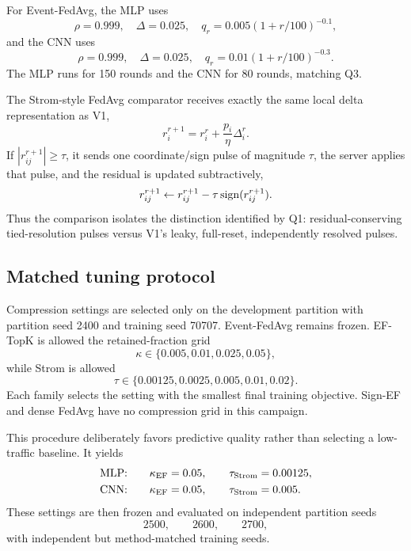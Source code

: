 For Event-FedAvg, the MLP uses
\begin{equation}
    \rho=0.999,\quad \Delta=0.025,\quad
    q_r=0.005(1+r/100)^{-0.1},
\end{equation}
and the CNN uses
\begin{equation}
    \rho=0.999,\quad \Delta=0.025,\quad
    q_r=0.01(1+r/100)^{-0.3}.
\end{equation}
The MLP runs for 150 rounds and the CNN for 80 rounds, matching Q3.

The Strom-style FedAvg comparator receives exactly the same local delta representation as V1,
\begin{equation}
    r_i^{r+1}=r_i^r+\frac{p_i}{\eta}\Delta_i^r.
\end{equation}
If $|r_{ij}^{r+1}|\geq\tau$, it sends one coordinate/sign pulse of magnitude $\tau$, the server applies that pulse, and the residual is updated subtractively,
\begin{equation}
    r_{ij}^{r+1}\leftarrow
    r_{ij}^{r+1}-\tau\operatorname{sign}(r_{ij}^{r+1}).
\end{equation}
Thus the comparison isolates the distinction identified by Q1: residual-conserving tied-resolution pulses versus V1's leaky, full-reset, independently resolved pulses.

\subsection{Matched tuning protocol}

Compression settings are selected only on the development partition with partition seed 2400 and training seed 70707. Event-FedAvg remains frozen. EF-TopK is allowed the retained-fraction grid
\begin{equation}
    \kappa\in\{0.005,0.01,0.025,0.05\},
\end{equation}
while Strom is allowed
\begin{equation}
    \tau\in\{0.00125,0.0025,0.005,0.01,0.02\}.
\end{equation}
Each family selects the setting with the smallest final training objective. Sign-EF and dense FedAvg have no compression grid in this campaign.

This procedure deliberately favors predictive quality rather than selecting a low-traffic baseline. It yields
\begin{equation}
\begin{aligned}
\text{MLP:}\qquad &\kappa_{\rm EF}=0.05,\qquad \tau_{\rm Strom}=0.00125,\\
\text{CNN:}\qquad &\kappa_{\rm EF}=0.05,\qquad \tau_{\rm Strom}=0.005.
\end{aligned}
\end{equation}
These settings are then frozen and evaluated on independent partition seeds
\begin{equation}
    2500,\qquad2600,\qquad2700,
\end{equation}
with independent but method-matched training seeds.

